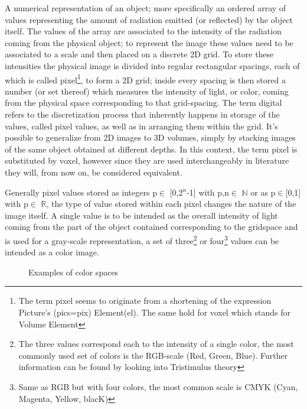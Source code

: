 \begin{definition}
A numerical representation of an object; more specifically an ordered array of values representing the amount of radiation emitted (or reflected) by the object itself. The values of the array are associated to the intensity of the radiation coming from the physical object; to represent the image these values need to be associated to a scale and then placed on a discrete 2D grid. 
To store these intensities the physical image is divided into regular rectangular spacings, each of which is called pixel\footnote{The term pixel seems to originate from a shortening of the expression Picture's (pics=pix) Element(el). The same hold for voxel which stands for Volume Element}, to form a 2D grid; inside every spacing is then stored a number (or set thereof) which measures the intensity of light, or color, coming from the physical space corresponding to that grid-spacing. 
The term digital refers to the discretization process that inherently happens in storage of the values, called pixel values, as well as in arranging them within the grid. It's possible to generalize from 2D images to 3D volumes, simply by stacking images of the same object obtained at different depths. In this context, the term pixel is substituted by voxel, however since they are used interchangeably in literature they will, from now on, be considered equivalent.
\end{definition}

Generally pixel values stored as integers p$\in$ [0,2$^{n}$-1] with p,n$\in$ $\mathbb{N}$  or as p$\in$[0,1] with p$\in$ $\mathbb{R}$, the type of value stored within each pixel changes the nature of the image itself. 
A single value is to be intended as the overall intensity of light coming from the part of the object contained corresponding to the gridspace and is used for a gray-scale representation, a set of three\footnote{The three values correspond each to the intensity of a single color, the most commonly used set of colors is the RGB-scale (Red, Green, Blue). Further information can be found by looking into Tristimulus theory\cite{Tristimulus}}  or four\footnote{Same as RGB but with four colors, the most common scale is CMYK (Cyan, Magenta, Yellow, blacK)} values can be intended as a color image.

\begin{figure}[H]
     \centering
    \qquad
     \caption{Examples of color spaces}
     \label{fig:color_spaces}
\end{figure}

